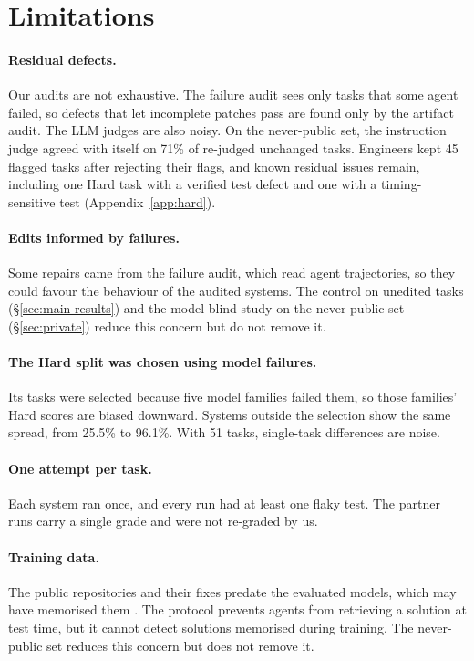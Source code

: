 \section*{Limitations}
\label{sec:limitations}
\paragraph{Residual defects.} Our audits are not exhaustive. The failure audit sees only tasks that some agent failed, so defects that let incomplete patches pass are found only by the artifact audit. The LLM judges are also noisy. On the never-public set, the instruction judge agreed with itself on 71\% of re-judged unchanged tasks. Engineers kept 45 flagged tasks after rejecting their flags, and known residual issues remain, including one Hard task with a verified test defect and one with a timing-sensitive test (Appendix~\ref{app:hard}).

\paragraph{Edits informed by failures.} Some repairs came from the failure audit, which read agent trajectories, so they could favour the behaviour of the audited systems. The control on unedited tasks (\S\ref{sec:main-results}) and the model-blind study on the never-public set (\S\ref{sec:private}) reduce this concern but do not remove it.

\paragraph{The Hard split was chosen using model failures.} Its tasks were selected because five model families failed them, so those families' Hard scores are biased downward. Systems outside the selection show the same spread, from 25.5\% to 96.1\%. With 51 tasks, single-task differences are noise.

\paragraph{One attempt per task.} Each system ran once, and every run had at least one flaky test. The partner runs carry a single grade and were not re-graded by us.

\paragraph{Training data.} The public repositories and their fixes predate the evaluated models, which may have memorised them \citep{liang2025swebenchillusion,ramos2024memorization}. The protocol prevents agents from retrieving a solution at test time, but it cannot detect solutions memorised during training. The never-public set reduces this concern but does not remove it.

